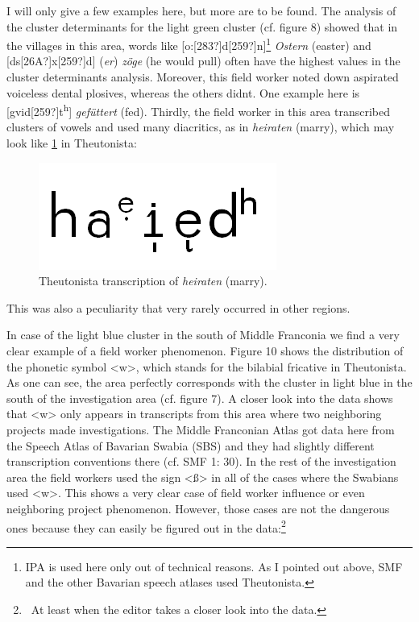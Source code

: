 \documentclass[output=paper]{LSP/langsci}
\begin{document}
I will only give a few examples here, but more are to be found. The analysis of the cluster determinants for the light green cluster (cf. figure 8) showed that in the villages in this area, words like [o:[283?]d[259?]n]\footnote{IPA is used here only out of technical reasons. As I pointed out above, SMF and the other Bavarian speech atlases used Theutonista.} \textit{Ostern} ({\textquotesingle}easter{\textquotesingle}) and [ds[26A?]x[259?]d] (\textit{er}) \textit{zöge} ({\textquotesingle}he would pull{\textquotesingle}) often have the highest values in the cluster determinants{\textquotesingle} analysis. Moreover, this field worker noted down aspirated voiceless dental plosives, whereas the others didn{\textquotesingle}t. One example here is [gvid[259?]t\textsuperscript{h}] \textit{gefüttert} ({\textquotesingle}fed{\textquotesingle}). Thirdly, the field worker in this area transcribed clusters of vowels and used many diacritics, as in \textit{heiraten} ({\textquotesingle}marry{\textquotesingle}), which may look like \ref{fig:9} in Theutonista:

\begin{figure}
\includegraphics[width=.25\textwidth]{illustrations/mathus_fig9}
\caption{Theutonista transcription of \textit{heiraten} ({\textquotesingle}marry{\textquotesingle}).}
\label{fig:9}
\end{figure}

This was also a peculiarity that very rarely occurred in other regions.

In case of the light blue cluster in the south of Middle Franconia we find a very clear example of a field worker phenomenon. Figure 10 shows the distribution of the phonetic symbol {\textless}w{\textgreater}, which stands for the bilabial fricative in Theutonista. As one can see, the area perfectly corresponds with the cluster in light blue in the south of the investigation area (cf. figure 7). A closer look into the data shows that {\textless}w{\textgreater} only appears in transcripts from this area where two neighboring projects made investigations. The Middle Franconian Atlas got data here from the Speech Atlas of Bavarian Swabia (SBS) and they had slightly different transcription conventions there (cf. SMF 1: 30). In the rest of the investigation area the field workers used the sign {\textless}ß{\textgreater} in all of the cases where the Swabians used {\textless}w{\textgreater}. This shows a very clear case of field worker influence or even neighboring project phenomenon. However, those cases are not the dangerous ones because they can easily be figured out in the data:\footnote{\ At least when the editor takes a closer look into the data.}
\end{document}
